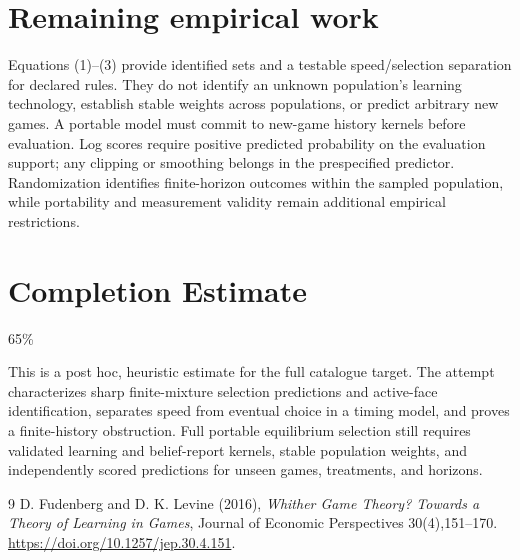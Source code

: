 \documentclass[11pt]{article}
\theoremstyle{definition}
\begin{document}
\section*{Remaining empirical work}
Equations (1)--(3) provide identified sets and a testable speed/selection
separation for declared rules. They do not identify an unknown population's
learning technology, establish stable weights across populations, or predict
arbitrary new games. A portable model must commit to new-game history
kernels before evaluation. Log scores require positive predicted probability
on the evaluation support; any clipping or smoothing belongs in the
prespecified predictor. Randomization identifies finite-horizon outcomes
within the sampled population, while portability and measurement validity
remain additional empirical restrictions.

\section{Completion Estimate}
65\%

This is a post hoc, heuristic estimate for the full catalogue target.
The attempt characterizes sharp finite-mixture selection predictions and active-face identification, separates speed from eventual choice in a timing model, and proves a finite-history obstruction. Full portable equilibrium selection still requires validated learning and belief-report kernels, stable population weights, and independently scored predictions for unseen games, treatments, and horizons.

\begin{thebibliography}{9}
 D. Fudenberg and D. K. Levine (2016), \emph{Whither Game
Theory? Towards a Theory of Learning in Games}, Journal of Economic
Perspectives 30(4),151--170.
\url{https://doi.org/10.1257/jep.30.4.151}.
\end{thebibliography}
\end{document}
